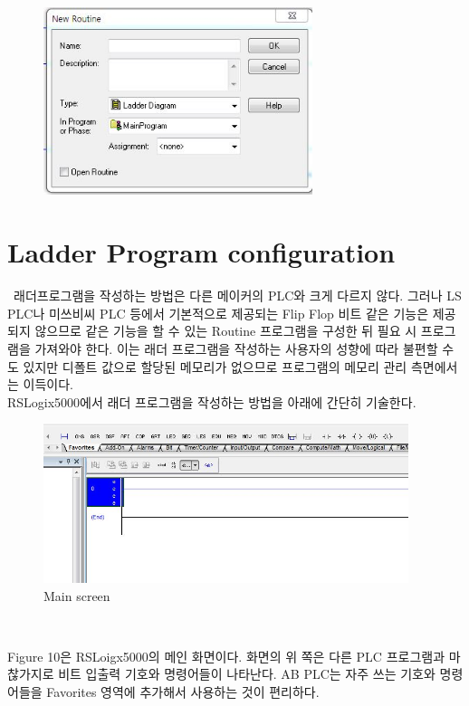 \documentclass[11pt
  , a4paper
  , article
  , oneside
]{memoir}
\begin{document}
\begin{figure}[h]
	\centering
	\includegraphics[width=0.7\textwidth]{./picture/routine_setting.JPG}
	\caption{}
	\label{fig:}
\end{figure}  
 

\newpage
 
\section{Ladder Program configuration}\
래더프로그램을 작성하는 방법은 다른 메이커의 PLC와 크게 다르지 않다. 그러나 LS PLC나 미쓰비씨 PLC 등에서 기본적으로 제공되는 Flip Flop 비트 같은 기능은 제공되지 않으므로 같은 기능을 할 수 있는 Routine 프로그램을 구성한 뒤 필요 시 프로그램을 가져와야 한다. 이는 래더 프로그램을 작성하는 사용자의 성향에 따라 불편할 수도 있지만 디폴트 값으로 할당된 메모리가 없으므로 프로그램의 메모리 관리 측면에서는 이득이다.\\

RSLogix5000에서 래더 프로그램을 작성하는 방법을 아래에 간단히 기술한다.    

\begin{figure}[h]
	\centering
	\includegraphics[width=0.95\textwidth]{./picture/menu.JPG}
	\caption{Main screen}
	\label{fig:}
\end{figure}  \

Figure 10은 RSLoigx5000의 메인 화면이다. 화면의 위 쪽은 다른 PLC 프로그램과 마찮가지로 비트 입출력 기호와 명령어들이 나타난다. AB PLC는 자주 쓰는 기호와 명령어들을 Favorites 영역에 추가해서 사용하는 것이 편리하다.
\end{document}
